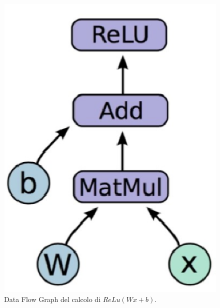 \documentclass[a4paper,12pt,oneside]{book}
\begin{document}
\begin{figure}[!ht]
\centering
\includegraphics[scale=0.6]{flowgraph}
\caption{Data Flow Graph del calcolo di $ReLu(Wx+b)$.}
\end{figure}
\end{document}
